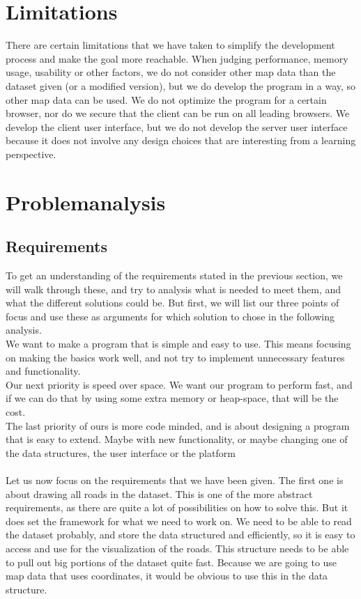 \documentclass[a4paper,10pt,titlepage]{article}
\begin{document}
	\newpage
	\section{Limitations}
		
		There are certain limitations that we have taken to simplify the development process and make the goal more reachable. When judging performance, memory usage, usability or other factors, we do not consider other map data than the dataset given (or a modified version), but we do develop the program in a way, so other map data can be used. We do not optimize the program for a certain browser, nor do we secure that the client can be run on all leading browsers. We develop the client user interface, but we do not develop the server user interface because it does not involve any design choices that are interesting from a learning perspective.


	\section{Problemanalysis}
		\subsection{Requirements}
To get an understanding of the requirements stated in the previous section, we will walk through these, and try to analysis what is needed to meet them, and what the different solutions could be. But first, we will list our three points of focus and use these as arguments for which solution to chose in the following analysis.\\
We want to make a program that is simple and easy to use. This means focusing on making the basics work well, and not try to implement unnecessary features and functionality.\\

Our next priority is speed over space. We want our program to perform fast, and if we can do that by using some extra     memory or heap-space, that will be the cost.\\

The last priority of ours is more code minded, and is about designing a program that is easy to extend. Maybe with new functionality, or maybe changing one of the data structures, the user interface or the platform\\
\\

Let us now focus on the requirements that we have been given. The first one is about drawing all roads in the dataset. This is one of the more abstract requirements, as there are quite a lot of possibilities on how to solve this. But it does set the framework for what we need to work on. We need to be able to read the dataset probably, and store the data structured and efficiently, so it is easy to access and use for the visualization of the roads. This structure needs to be able to pull out big portions of the dataset quite fast. Because we are going to use map data that uses coordinates, it would be obvious to use this in the data structure.\\
\end{document}
